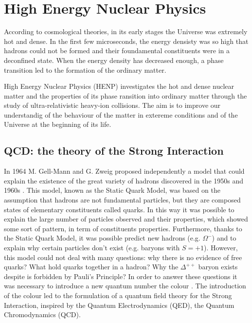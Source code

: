 %
\chapter{High Energy Nuclear Physics}
\label{sec:1}



According to cosmological theories, in its early stages the Universe was extremely hot and dense.
In the first few microseconds, the energy densisty was so high that hadrons could not be formed and
their foundamental constituents were in a deconfined state. When the energy density has decreased
enough, a phase transition led to the formation of the ordinary matter. 

High Energy Nuclear Physics (HENP) investigates the hot and dense nuclear matter and the properties
of its phase ransition into ordinary matter through the study of ultra-relativistic heavy-ion collisions. 
The aim is to improve our understandig of the behaviour of the matter in extereme conditions and of the
Universe at the beginning of its life.

\section{QCD: the theory of the Strong Interaction}
\label{sec:1.1}


In 1964 M. Gell-Mann and G. Zweig proposed independently a model that could explain the existence of
the great variety of hadrons discovered in the 1950s and 1960s 
\cite{gellmann, zweig1, zweig2}. 
This model, known as the Static Quark Model, was based on the assumption that hadrons are not
fundamental particles, but they are composed states of elementary constituents called quarks.
In this way it was possible to explain the large number of particles observed and their properties,
which showed some sort of pattern, in term of constituents properties.
Furthermore, thanks to the Static Quark Model, it was possible predict new hadrons (e.g. 
$\Omega^{-}\xspace$) and to explain why certain particles don't exist (e.g. baryons with $S=+1$).
However, this model could not deal with many questions: why there is no evidence of free quarks?
What hold quarks together in a hadron? Why the $\Delta^{++}$ baryon exists despite is forbidden
by Pauli's Principle?
In order to answer these questions it was necessary to introduce a new quantum number the colour
\cite{fritzsch-gellmann}. The introduction of the colour led to the formulation of a quantum field theory
for the Strong Interaction, inspired by the Quantum Electrodynamics (QED), the Quantum Chromodynamics
(QCD).

